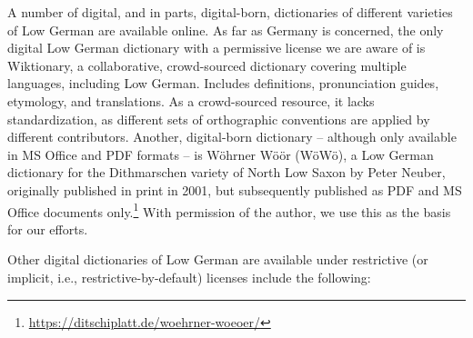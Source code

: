 \documentclass[11pt]{article}
\begin{document}
A number of digital, and in parts, digital-born, dictionaries of different varieties of Low German are available online. As far as Germany is concerned, the only digital Low German dictionary with a permissive license we are aware of is Wiktionary, a collaborative, crowd-sourced dictionary covering multiple languages, including Low German. Includes definitions, pronunciation guides, etymology, and translations. As a crowd-sourced resource, it lacks standardization, as different sets of orthographic conventions are applied by different contributors. Another, digital-born dictionary -- although only available in MS Office and PDF formats -- is Wöhrner Wöör (WöWö), a Low German dictionary for the Dithmarschen variety of North Low Saxon by Peter Neuber, originally published in print in 2001, but subsequently published as PDF and MS Office documents only.\footnote{\url{https://ditschiplatt.de/woehrner-woeoer/}} 
With permission of the author, %
we use this as the basis for our efforts.

Other digital dictionaries of Low German are available under restrictive (or implicit, i.e., restrictive-by-default) licenses include the following:
\end{document}
